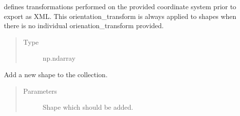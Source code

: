 \documentclass[letterpaper,10pt,english,openany,oneside]{sphinxmanual}
\begin{document}
\begin{fulllineitems}
\begin{fulllineitems}
\begin{quote}
\begin{description}
\end{description}\end{quote}

\end{fulllineitems}


\begin{fulllineitems}
\label{\detokenize{pages/modules:lmd.lib.Collection.orientation_transform}}
\sphinxAtStartPar
defines transformations performed on the provided coordinate system prior to export as XML. This orientation\_transform is always applied to shapes when there is no individual orienation\_transform provided.
\begin{quote}\begin{description}
\item[{Type}] \leavevmode
\sphinxAtStartPar
np.ndarray

\end{description}\end{quote}

\end{fulllineitems}


\begin{fulllineitems}
\label{\detokenize{pages/modules:lmd.lib.Collection.add_shape}}
\sphinxAtStartPar
Add a new shape to the collection.
\begin{quote}\begin{description}
\item[{Parameters}] \leavevmode
\sphinxAtStartPar
{} \textendash{} Shape which should be added.

\end{description}\end{quote}

\end{fulllineitems}



\end{fulllineitems}
\end{document}
